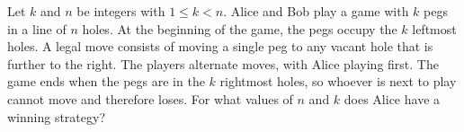 Let $k$ and $n$ be integers with $1 \leq k < n$. Alice and Bob play a game with $k$ pegs in a line of $n$ holes. At the beginning of the game, the pegs occupy the $k$ leftmost holes. A legal move consists of moving a single peg
to any vacant hole that is further to the right. The players alternate moves, with Alice playing first. The game ends when the pegs are in the $k$ rightmost holes, so whoever is next to play cannot move and therefore loses. For what values
of $n$ and $k$ does Alice have a winning strategy?

